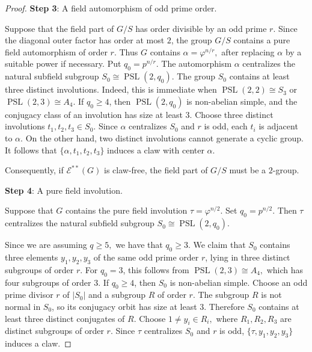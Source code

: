 \documentclass[preprint,11pt]{elsarticle}
\begin{document}
\begin{proof}
	\medskip
	\noindent
	\textbf{Step 3}: A field automorphism of odd prime order.
	
	Suppose that the field part of $G/S$ has order divisible by an
	odd prime $r$.  Since the diagonal outer factor has order at
	most $2$, the group $G/S$ contains a pure field automorphism of
	order $r$.  Thus $G$ contains
$
	\alpha=\varphi^{n/r},
$
	after replacing $\alpha$ by a suitable power if necessary.
	Put
$
	q_0=p^{n/r}.
$
	The automorphism $\alpha$ centralizes the natural subfield
	subgroup $
	S_0\cong\operatorname{PSL}(2,q_0).$
	The group $S_0$ contains at least three distinct involutions.
	Indeed, this is immediate when
$
	\operatorname{PSL}(2,2)\cong S_3$
or $	\operatorname{PSL}(2,3)\cong A_4.
$
	If $q_0\geq4$, then $\operatorname{PSL}(2,q_0)$ is non-abelian
	simple, and the conjugacy class of an involution has size at
	least $3$.
	Choose three distinct involutions
$
	t_1,t_2,t_3\in S_0.
$
	Since $\alpha$ centralizes $S_0$ and $r$ is odd,
each $t_i$ is adjacent to $\alpha$.
	On the other hand, two distinct involutions cannot generate a
	cyclic group. It
	follows that
$
	\{\alpha,t_1,t_2,t_3\}
$
	induces a claw with center $\alpha$.
	
	\medskip
	
	Consequently, if $\mathcal{E}^{**}(G)$ is claw-free, the field
	part of $G/S$ must be a $2$-group.
	
	\medskip
	\noindent
	\textbf{Step 4}: A pure field involution.
	
	Suppose that $G$ contains the pure field involution
$
	\tau=\varphi^{n/2}.
$
	Set
$
	q_0=p^{n/2}.
$
	Then $\tau$ centralizes the natural subfield subgroup
$
	S_0\cong\operatorname{PSL}(2,q_0).
$
	
Since we are assuming $q\geq 5,$ we have that $q_0\geq3$.  We claim that $S_0$ contains
	three elements
$
	y_1,y_2,y_3
$
	of the same odd prime order $r$, lying in three distinct
	subgroups of order $r$.
	For $q_0=3$, this follows from
$
	\operatorname{PSL}(2,3)\cong A_4,
$
	which has four subgroups of order $3$.  If $q_0\geq4$, then
	$S_0$ is non-abelian simple.  Choose an odd prime divisor $r$
	of $|S_0|$ and a subgroup $R$ of order $r$.  The subgroup $R$
	is not normal in $S_0$, so its conjugacy orbit has size at
	least $3$.  Therefore $S_0$ contains at least three distinct
	conjugates of $R$. Choose $1\neq y_i\in R_i,$
	where $R_1,R_2,R_3$ are distinct subgroups of order $r$.
	Since $\tau$ centralizes $S_0$ and $r$ is odd,
	$\{\tau,y_1,y_2,y_3\}$
	induces a claw.
	
%
	

\end{proof}
\end{document}
